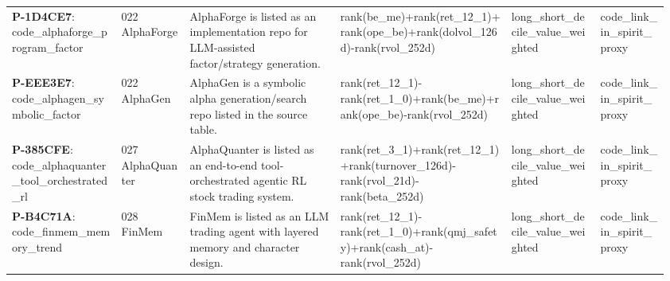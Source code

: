 \begin{longtable}{@{}L{0.16\linewidth}L{0.10\linewidth}L{0.22\linewidth}L{0.25\linewidth}L{0.13\linewidth}L{0.10\linewidth}@{}}
\textbf{P-1D4CE7}: code\_\allowbreak{}alphaforge\_\allowbreak{}program\_\allowbreak{}factor & 022 AlphaForge & AlphaForge is listed as an implementation repo for LLM-assisted factor/strategy generation. & rank(\allowbreak{}be\_\allowbreak{}me)\allowbreak{}+\allowbreak{}rank(\allowbreak{}ret\_\allowbreak{}12\_\allowbreak{}1)\allowbreak{}+\allowbreak{}rank(\allowbreak{}ope\_\allowbreak{}be)\allowbreak{}+\allowbreak{}rank(\allowbreak{}dolvol\_\allowbreak{}126d)\allowbreak{}-\allowbreak{}rank(\allowbreak{}rvol\_\allowbreak{}252d)\allowbreak{} & long\_\allowbreak{}short\_\allowbreak{}decile\_\allowbreak{}value\_\allowbreak{}weighted & code\_\allowbreak{}link\_\allowbreak{}in\_\allowbreak{}spirit\_\allowbreak{}proxy \\
\textbf{P-EEE3E7}: code\_\allowbreak{}alphagen\_\allowbreak{}symbolic\_\allowbreak{}factor & 022 AlphaGen & AlphaGen is a symbolic alpha generation/search repo listed in the source table. & rank(\allowbreak{}ret\_\allowbreak{}12\_\allowbreak{}1)\allowbreak{}-\allowbreak{}rank(\allowbreak{}ret\_\allowbreak{}1\_\allowbreak{}0)\allowbreak{}+\allowbreak{}rank(\allowbreak{}be\_\allowbreak{}me)\allowbreak{}+\allowbreak{}rank(\allowbreak{}ope\_\allowbreak{}be)\allowbreak{}-\allowbreak{}rank(\allowbreak{}rvol\_\allowbreak{}252d)\allowbreak{} & long\_\allowbreak{}short\_\allowbreak{}decile\_\allowbreak{}value\_\allowbreak{}weighted & code\_\allowbreak{}link\_\allowbreak{}in\_\allowbreak{}spirit\_\allowbreak{}proxy \\
\textbf{P-385CFE}: code\_\allowbreak{}alphaquanter\allowbreak{}\_\allowbreak{}tool\_\allowbreak{}orchestrated\allowbreak{}\_\allowbreak{}rl & 027 AlphaQuanter & AlphaQuanter is listed as an end-to-end tool-orchestrated agentic RL stock trading system. & rank(\allowbreak{}ret\_\allowbreak{}3\_\allowbreak{}1)\allowbreak{}+\allowbreak{}rank(\allowbreak{}ret\_\allowbreak{}12\_\allowbreak{}1)\allowbreak{}+\allowbreak{}rank(\allowbreak{}turnover\_\allowbreak{}126d)\allowbreak{}-\allowbreak{}rank(\allowbreak{}rvol\_\allowbreak{}21d)\allowbreak{}-\allowbreak{}rank(\allowbreak{}beta\_\allowbreak{}252d)\allowbreak{} & long\_\allowbreak{}short\_\allowbreak{}decile\_\allowbreak{}value\_\allowbreak{}weighted & code\_\allowbreak{}link\_\allowbreak{}in\_\allowbreak{}spirit\_\allowbreak{}proxy \\
\textbf{P-B4C71A}: code\_\allowbreak{}finmem\_\allowbreak{}memory\_\allowbreak{}trend & 028 FinMem & FinMem is listed as an LLM trading agent with layered memory and character design. & rank(\allowbreak{}ret\_\allowbreak{}12\_\allowbreak{}1)\allowbreak{}-\allowbreak{}rank(\allowbreak{}ret\_\allowbreak{}1\_\allowbreak{}0)\allowbreak{}+\allowbreak{}rank(\allowbreak{}qmj\_\allowbreak{}safety)\allowbreak{}+\allowbreak{}rank(\allowbreak{}cash\_\allowbreak{}at)\allowbreak{}-\allowbreak{}rank(\allowbreak{}rvol\_\allowbreak{}252d)\allowbreak{} & long\_\allowbreak{}short\_\allowbreak{}decile\_\allowbreak{}value\_\allowbreak{}weighted & code\_\allowbreak{}link\_\allowbreak{}in\_\allowbreak{}spirit\_\allowbreak{}proxy \\

\end{longtable}
